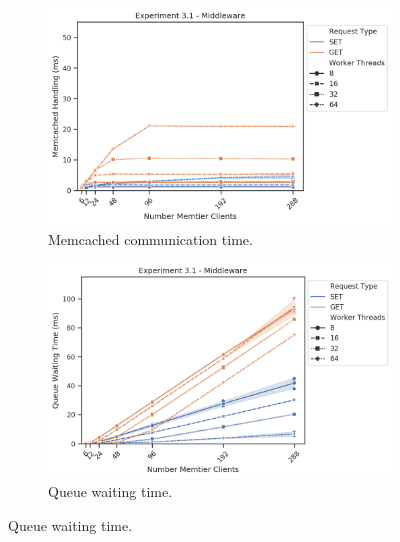 \begin{figure}
{\begin{subfigure}[t!]{0.55\textwidth}
                    \centering
                    \includegraphics[width=1\textwidth]{../data_analysis/figures/3-1_mw_mc-comm-time.png}
                    \caption{Memcached communication time.\label{fig:single_mw_mct}}
                \end{subfigure}
                \begin{subfigure}[t!]{0.55\textwidth}
                    \centering
                    \includegraphics[width=1\textwidth]{../data_analysis/figures/3-1_mw_queue-wait-time.png}
                    \caption{Queue waiting time.\label{fig:single_mw_qwt}}
                \end{subfigure}
            }
\end{figure}
